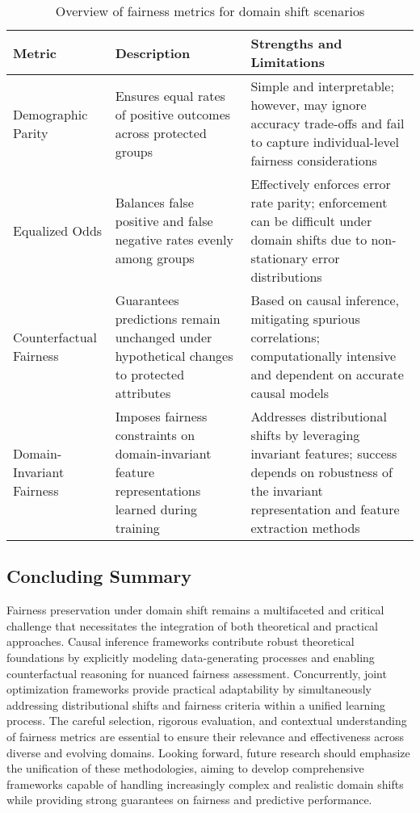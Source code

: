 \documentclass[sigconf]{acmart}
\begin{document}
\begin{table*}[htbp]
\centering
\caption{Overview of fairness metrics for domain shift scenarios}
\label{tab:fairness_domain_metrics}
\begin{adjustbox}{max width=\textwidth}
\begin{tabular}{@{}lll@{}}
\toprule
\textbf{Metric} & \textbf{Description} & \textbf{Strengths and Limitations} \\
\midrule
Demographic Parity & Ensures equal rates of positive outcomes across protected groups & Simple and interpretable; however, may ignore accuracy trade-offs and fail to capture individual-level fairness considerations \\
Equalized Odds & Balances false positive and false negative rates evenly among groups & Effectively enforces error rate parity; enforcement can be difficult under domain shifts due to non-stationary error distributions \\
Counterfactual Fairness & Guarantees predictions remain unchanged under hypothetical changes to protected attributes & Based on causal inference, mitigating spurious correlations; computationally intensive and dependent on accurate causal models \\
Domain-Invariant Fairness & Imposes fairness constraints on domain-invariant feature representations learned during training & Addresses distributional shifts by leveraging invariant features; success depends on robustness of the invariant representation and feature extraction methods \\
\bottomrule
\end{tabular}
\end{adjustbox}
\end{table*}

\subsection{Concluding Summary}
Fairness preservation under domain shift remains a multifaceted and critical challenge that necessitates the integration of both theoretical and practical approaches. Causal inference frameworks contribute robust theoretical foundations by explicitly modeling data-generating processes and enabling counterfactual reasoning for nuanced fairness assessment. Concurrently, joint optimization frameworks provide practical adaptability by simultaneously addressing distributional shifts and fairness criteria within a unified learning process. The careful selection, rigorous evaluation, and contextual understanding of fairness metrics are essential to ensure their relevance and effectiveness across diverse and evolving domains. Looking forward, future research should emphasize the unification of these methodologies, aiming to develop comprehensive frameworks capable of handling increasingly complex and realistic domain shifts while providing strong guarantees on fairness and predictive performance.
\end{document}

